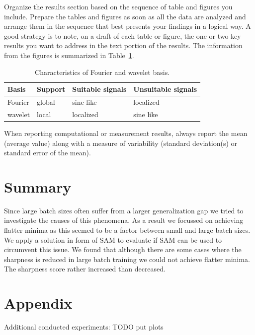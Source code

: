 \documentclass[10pt,conference,compsocconf]{IEEEtran}
\begin{document}
Organize the results section based on the sequence of table and
figures you include. Prepare the tables and figures as soon as all
the data are analyzed and arrange them in the sequence that best
presents your findings in a logical way. A good strategy is to note,
on a draft of each table or figure, the one or two key results you
want to address in the text portion of the results.
The information from the figures is
summarized in Table~\ref{tab:fourier-wavelet}.

\begin{table}[htbp]
  \centering
  \begin{tabular}[c]{|l||l|l|l|}
    \hline
    Basis&Support&Suitable signals&Unsuitable signals\\
    \hline
    Fourier&global&sine like&localized\\
    wavelet&local&localized&sine like\\
    \hline
  \end{tabular}
  \caption{Characteristics of Fourier and wavelet basis.}
  \label{tab:fourier-wavelet}
\end{table}

When reporting computational or measurement results, always
report the mean (average value) along with a measure of variability
(standard deviation(s) or standard error of the mean).



\section{Summary}

Since large batch sizes often suffer from a larger generalization gap we tried to investigate the causes of this phenomena. As a result we focussed on achieving flatter minima as this seemed to be a factor between small and large batch sizes. We apply a solution in form of SAM to evaluate if SAM can be used to circumvent this issue. We found that although there are some cases where the sharpness is reduced in large batch training we could not achieve flatter minima. The sharpness score rather increased than decreased.

\section*{Appendix}
\label{sec:appendix}
Additional conducted experiments:
TODO put plots

\newpage


\end{document}
